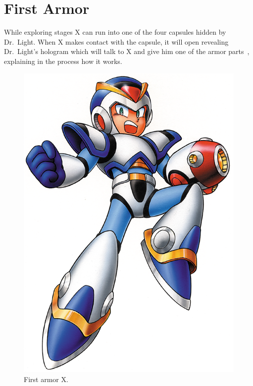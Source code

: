 \chapter{First Armor}\label{X1:Armor}

While exploring stages X can run into one of the four capsules hidden by Dr.~Light. When X makes contact with the capsule, it will open revealing Dr.~Light's hologram which will talk to X and give him one of the armor parts~\cite{wiki:First_armor}, explaining in the process how it works.
\begin{figure}[htp]
	\centering
	\includegraphics[width=0.2\linewidth]{figures/X1/First_armor.png}
	\caption{First armor X.}
\end{figure}


